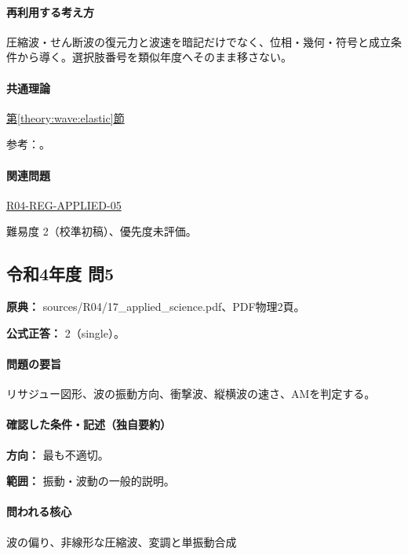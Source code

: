 \paragraph{再利用する考え方} 圧縮波・せん断波の復元力と波速を暗記だけでなく、位相・幾何・符号と成立条件から導く。選択肢番号を類似年度へそのまま移さない。

\paragraph{共通理論} \hyperref[theory:wave:elastic]{第\ref*{theory:wave:elastic}節}

\par 参考：\cite{os_sound}。

\paragraph{関連問題} \hyperref[q:r04-reg-applied-05]{R04-REG-APPLIED-05}

\par 難易度 2（校準初稿）、優先度未評価。

\subsection{令和4年度 問5}
\label{q:r04-reg-applied-05}

\noindent\textbf{原典：} sources/R04/17\_applied\_science.pdf、PDF物理2頁。

\textbf{公式正答：} 2（single）。

\paragraph{問題の要旨} リサジュー図形、波の振動方向、衝撃波、縦横波の速さ、AMを判定する。

\paragraph{確認した条件・記述（独自要約）}\mbox{}\par

\noindent\textbf{方向：} 最も不適切。\par

\noindent\textbf{範囲：} 振動・波動の一般的説明。\par

\paragraph{問われる核心} 波の偏り、非線形な圧縮波、変調と単振動合成

